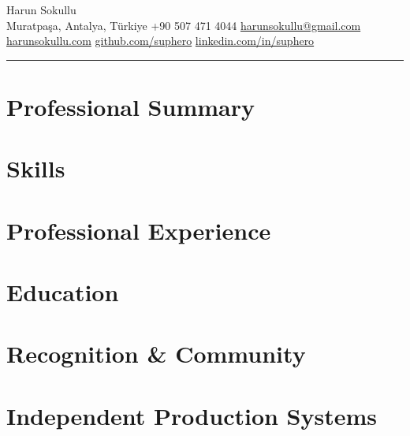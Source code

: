 \documentclass[10pt,a4paper]{article}
\newcommand{\sectiondivider}{\par\vspace{4pt}\noindent\textcolor{accent}{\rule{\linewidth}{0.6pt}}\vspace{6pt}}
\begin{document}
\raggedright

\begin{center}
  {\LARGE Harun Sokullu}\\[4pt]
  Muratpaşa, Antalya, Türkiye \textbar{} +90 507 471 4044 \textbar{} \href{mailto:harunsokullu@gmail.com}{harunsokullu@gmail.com}\\
  \href{https://harunsokullu.com}{harunsokullu.com} \textbar{} \href{https://github.com/suphero}{github.com/suphero} \textbar{} \href{https://www.linkedin.com/in/suphero}{linkedin.com/in/suphero}
\end{center}

\sectiondivider

\section*{Professional Summary}


\section*{Skills}


\section*{Professional Experience}


\section*{Education}


\section*{Recognition \& Community}


\section*{Independent Production Systems}

\end{document}
